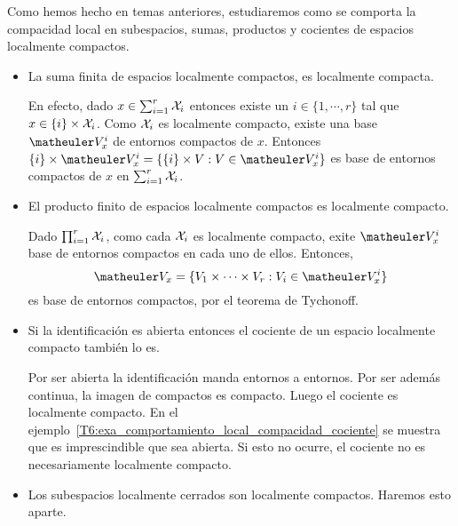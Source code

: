 Como hemos hecho en temas anteriores, estudiaremos como se comporta la compacidad local en subespacios, sumas, productos y cocientes de espacios localmente compactos.

\begin{itemize}
	\item La suma finita de espacios localmente compactos, es localmente compacta.
	
	En efecto, dado $x\in\sum_{i=1}^r \mathcal{X}_i$ entonces existe un $i\in\{1,\cdots,r\}$ tal que $x\in \{i\}\times \mathcal{X}_i$. Como $\mathcal{X}_i$ es localmente compacto, existe una base $\Va{x}^i$ de entornos compactos de $x$. Entonces $\{i\}\times \Va{x}^i=\{\{i\}\times V : V\in\Va{x}^i\}$ es base de entornos compactos de $x$ en $\sum_{i=1}^r \mathcal{X}_i$.
	
	\item El producto finito de espacios localmente compactos es localmente compacto.
	
	Dado $\prod_{i=1}^r\mathcal{X}_i$, como cada $\mathcal{X}_i$ es localmente compacto, exite $\Va{x}^i$ base de entornos compactos en cada uno de ellos. Entonces, 
	\[\Va{x}=\{V_1\times\cdots\times V_r: V_i\in\Va{x}^i\}\]
	es base de entornos compactos, por el teorema de Tychonoff.
	
	\item Si la identificación es abierta entonces el cociente de un espacio localmente compacto también lo es.
	
	Por ser abierta la identificación manda entornos a entornos. Por ser además continua, la imagen de compactos es compacto. Luego el cociente es localmente compacto. En el ejemplo~\ref{T6:exa_comportamiento_local_compacidad_cociente} se muestra que es imprescindible que sea abierta. Si esto no ocurre, el cociente no es necesariamente localmente compacto.
	
	\item Los subespacios localmente cerrados son localmente compactos. Haremos esto aparte.
\end{itemize}

